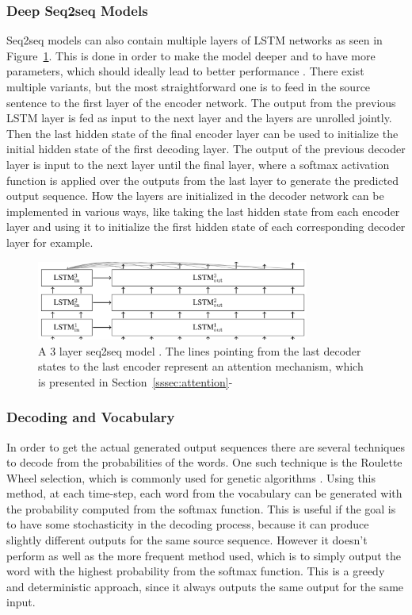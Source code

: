 \documentclass[12pt]{article}
\begin{document}
\subsubsection{Deep Seq2seq Models}
Seq2seq models can also contain multiple layers of LSTM networks as seen in Figure~\ref{fig:232b}. This is done in order to make the model deeper and to have more parameters, which should ideally lead to better performance \cite{Vinyals:2015,googleNMT:2016}. There exist multiple variants, but the most straightforward one is to feed in the source sentence to the first layer of the encoder network. The output from the previous LSTM layer is fed as input to the next layer and the layers are unrolled jointly. Then the last hidden state of the final encoder layer can be used to initialize the initial hidden state of the first decoding layer. The output of the previous decoder layer is input to the next layer until the final layer, where a softmax activation function is applied over the outputs from the last layer to generate the predicted output sequence. How the layers are initialized in the decoder network can be implemented in various ways, like taking the last hidden state from each encoder layer and using it to initialize the first hidden state of each corresponding decoder layer for example.

\begin{figure}[H]
	\centering
	\includegraphics[width=0.8\textwidth]{pics/deep_seq2seq.png}
	\caption{A 3 layer seq2seq model \cite{deep_seq2seq}. The lines pointing from the last decoder states to the last encoder represent an attention mechanism, which is presented in Section~\ref{sssec:attention}-}
	\label{fig:232b}
\end{figure}

\subsubsection{Decoding and Vocabulary} \label{sssec:234}
In order to get the actual generated output sequences there are several techniques to decode from the probabilities of the words. One such technique is the Roulette Wheel selection, which is commonly used for genetic algorithms \cite{GA:1998}. Using this method, at each time-step, each word from the vocabulary can be generated with the probability computed from the softmax function. This is useful if the goal is to have some stochasticity in the decoding process, because it can produce slightly different outputs for the same source sequence. However it doesn't perform as well as the more frequent method used, which is to simply output the word with the highest probability from the softmax function. This is a greedy and deterministic approach, since it always outputs the same output for the same input.
\end{document}
